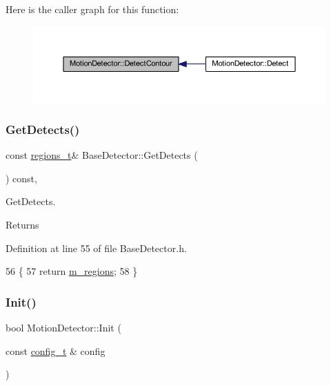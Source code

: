 Here is the caller graph for this function\+:\nopagebreak
\begin{figure}[H]
\begin{center}
\leavevmode
\includegraphics[width=350pt]{class_motion_detector_ab45a525c0ef2f5af9bc10c363c1b22e5_icgraph}
\end{center}
\end{figure}
\mbox{\label{class_base_detector_a52ac4b2feed15a47de84a69eb45c233f}} 
\subsubsection{\texorpdfstring{Get\+Detects()}{GetDetects()}}
{\footnotesize\ttfamily const \mbox{\hyperlink{defines_8h_a01db0de56a20f4342820a093c5154536}{regions\+\_\+t}}\& Base\+Detector\+::\+Get\+Detects (\begin{DoxyParamCaption}{ }\end{DoxyParamCaption}) const\hspace{0.3cm}{\ttfamily [inline]}, {\ttfamily [inherited]}}



Get\+Detects. 

\begin{DoxyReturn}{Returns}

\end{DoxyReturn}


Definition at line 55 of file Base\+Detector.\+h.


\begin{DoxyCode}
56     \{
57         \textcolor{keywordflow}{return} \mbox{\hyperlink{class_base_detector_a409c20093acba261db8354ca72058fce}{m\_regions}};
58     \}
\end{DoxyCode}
\mbox{\label{class_motion_detector_af59eda71fe52b578c08472425182dc41}} 
\subsubsection{\texorpdfstring{Init()}{Init()}}
{\footnotesize\ttfamily bool Motion\+Detector\+::\+Init (\begin{DoxyParamCaption}\item[{const \mbox{\hyperlink{defines_8h_a81d657237a541d02f8eeefdd40191920}{config\+\_\+t}} \&}]{config }\end{DoxyParamCaption})\hspace{0.3cm}{\ttfamily [virtual]}}



